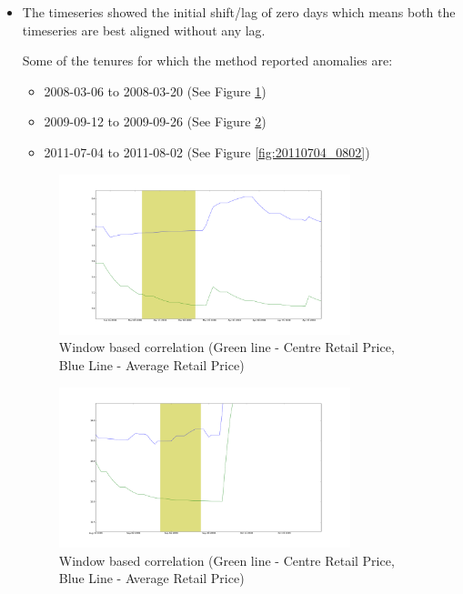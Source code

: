 		\begin{itemize}
			\item The timeseries showed the initial shift/lag of zero days which means both the timeseries are best aligned without any lag.
			
			Some of the tenures for which the method reported anomalies are:
			
			\begin{itemize}
				\item 2008-03-06 to 2008-03-20 (See Figure \ref{fig:20080306_0320})
				\item 2009-09-12 to 2009-09-26 (See Figure \ref{fig:20090912_0926})
				\item 2011-07-04 to 2011-08-02 (See Figure \ref{fig:20110704_0802})
			\end{itemize}
			\begin{figure}[H]
		    	\centering
  		    	\includegraphics[width=0.8\textwidth]{graphs/20080306_0320.png}
		    	\caption{Window based correlation (Green line - Centre Retail Price, Blue Line - Average Retail Price)}
		    	\label{fig:20080306_0320}
			\end{figure}
			
			\begin{figure}[H]
		    	\centering
  		    	\includegraphics[width=0.8\textwidth]{graphs/20090912_0926.png}
		    	\caption{Window based correlation (Green line - Centre Retail Price, Blue Line - Average Retail Price)}
		    	\label{fig:20090912_0926}
			\end{figure}


\end{itemize}
